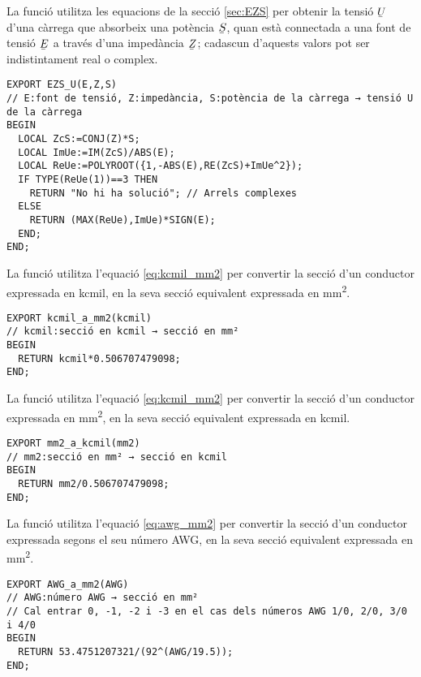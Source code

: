 La funció  utilitza les equacions de la secció \vref{sec:EZS} per obtenir la tensió $\cmplx{U}$ d'una càrrega que absorbeix una potència $\cmplx{S}$, quan està connectada a una font de tensió $\cmplx{E}$ a través d'una impedància $\cmplx{Z}$; cadascun d'aquests valors pot ser indistintament real o complex.

\begin{lstlisting}[caption={HP Prime --- Funció EZS\_U},label=lst:EZSU]
EXPORT EZS_U(E,Z,S)
// E:font de tensió, Z:impedància, S:potència de la càrrega → tensió U de la càrrega
BEGIN
  LOCAL ZcS:=CONJ(Z)*S;
  LOCAL ImUe:=IM(ZcS)/ABS(E);
  LOCAL ReUe:=POLYROOT({1,-ABS(E),RE(ZcS)+ImUe^2});
  IF TYPE(ReUe(1))==3 THEN
    RETURN "No hi ha solució"; // Arrels complexes
  ELSE
    RETURN (MAX(ReUe),ImUe)*SIGN(E);
  END;
END;
\end{lstlisting}

La funció  utilitza l'equació \eqref{eq:kcmil_mm2} per convertir la secció d'un conductor expressada en \unit{kcmil}, en la seva secció equivalent expressada en \unit{mm^2}.

\begin{lstlisting}[caption={HP Prime --- Funció kcmil\_a\_mm2}]
EXPORT kcmil_a_mm2(kcmil)
// kcmil:secció en kcmil → secció en mm²
BEGIN
  RETURN kcmil*0.506707479098;
END;
\end{lstlisting}

La funció  utilitza l'equació \eqref{eq:kcmil_mm2} per convertir la secció d'un conductor expressada en \unit{mm^2}, en la seva secció equivalent expressada en \unit{kcmil}.

\begin{lstlisting}[caption={HP Prime --- Funció mm2\_a\_kcmil}]
EXPORT mm2_a_kcmil(mm2)
// mm2:secció en mm² → secció en kcmil
BEGIN
  RETURN mm2/0.506707479098;
END;
\end{lstlisting}

La funció  utilitza l'equació \eqref{eq:awg_mm2} per convertir la secció d'un conductor expressada segons el seu número AWG, en la seva secció equivalent expressada en \unit{mm^2}.

\begin{lstlisting}[caption={HP Prime --- Funció AWG\_a\_mm2}]
EXPORT AWG_a_mm2(AWG)
// AWG:número AWG → secció en mm²
// Cal entrar 0, -1, -2 i -3 en el cas dels números AWG 1/0, 2/0, 3/0 i 4/0
BEGIN
  RETURN 53.4751207321/(92^(AWG/19.5));
END;
\end{lstlisting}

